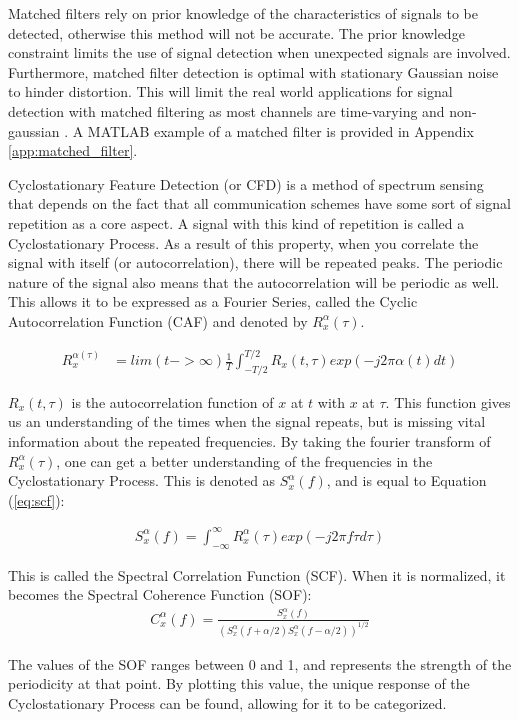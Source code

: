 Matched filters rely on prior knowledge of the characteristics of signals to be detected, otherwise this method will not be accurate. The prior knowledge constraint limits the use of signal detection when unexpected signals are involved. Furthermore, matched filter detection is optimal with stationary Gaussian noise to hinder distortion. This will limit the real world applications for signal detection with matched filtering as most channels are time-varying and non-gaussian \cite{channel_fade}. A MATLAB example of a matched filter is provided in Appendix \ref{app:matched_filter}. \par
Cyclostationary Feature Detection (or CFD) is a method of spectrum sensing that depends on the fact that all communication schemes have some sort of signal repetition as a core aspect. A signal with this kind of repetition is called a Cyclostationary Process\cite{cyclostat_journal}. As a result of this property, when you correlate the signal with itself (or autocorrelation), there will be repeated peaks. The periodic nature of the signal also means that the autocorrelation will be periodic as well. This allows it to be expressed as a Fourier Series, called the Cyclic Autocorrelation Function (CAF) and denoted by $R_x^\alpha(\tau)$\cite{cyclostat_text}.\par 

\begin{align}\label{eq:scf}
    R_x^{\alpha(\tau)} &= lim(t->\infty) \frac{1}{T} \int_{-T/2}^{T/2} R_x(t,\tau)exp(-j2\pi\alpha(t) dt)
\end{align}

$R_x(t,\tau)$ is the autocorrelation function of $x$ at $t$ with $x$ at $\tau$. This function gives us an understanding of the times when the signal repeats, but is missing vital information about the repeated frequencies. By taking the fourier transform of $R_x^\alpha(\tau)$, one can get a better understanding of the frequencies in the Cyclostationary Process. This is denoted as $S_x^\alpha(f)$, and is equal to Equation (\ref{eq:scf}):

\begin{align}\label{eq:scf}
S_x^\alpha(f)=\int_{-\infty}^{\infty} R_x^\alpha(\tau)exp(-j2\pi f\tau d\tau) 
\end{align}
\par

This is called the Spectral Correlation Function (SCF). When it is normalized, it becomes the Spectral Coherence Function (SOF):
\begin{align}
C_x^\alpha(f) = \frac{ S_x^\alpha(f)}{ (S_x^\alpha(f+\alpha/2) S_x^\alpha(f-\alpha/2))^{1/2}} \label{eq:caf}
\end{align} \par
The values of the SOF ranges between 0 and 1, and represents the strength of the periodicity at that point. By plotting this value, the unique response of the Cyclostationary Process can be found, allowing for it to be categorized.\par

